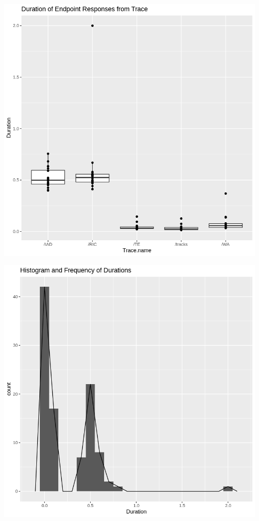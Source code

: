 \documentclass[
  letterpaper,
  DIV=11,
  numbers=noendperiod]{scrartcl}
\begin{document}
\includegraphics{dss-span-analysis-rev1_files/figure-pdf/cell-12-output-1.png}

\includegraphics{dss-span-analysis-rev1_files/figure-pdf/cell-13-output-1.png}
\end{document}
